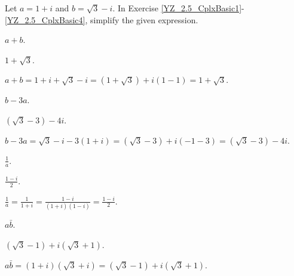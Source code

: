 \documentclass{ximera}
\begin{document}
Let $a=1+i$ and $b=\sqrt{3}-i$. In Exercise \ref{YZ_2.5_CplxBasic1}-\ref{YZ_2.5_CplxBasic4}, simplify the given expression.
\begin{exercise} \label{YZ_2.5_CplxBasic1}
$a+b$.

\begin{solution}
\ans $1+\sqrt{3}$.

\soln $a+b=1+i+\sqrt{3}-i=(1+\sqrt{3})+i(1-1)=1+\sqrt{3}$.

\end{solution}
\end{exercise}

\begin{exercise}\label{YZ_2.5_CplxBasic2}
$b-3a$.

\begin{solution}
\ans $(\sqrt{3}-3)-4i$.

\soln $b-3a=\sqrt{3}-i-3(1+i)=(\sqrt{3}-3)+i(-1-3)=(\sqrt{3}-3) - 4i$.
\end{solution}
\end{exercise}

\begin{exercise}\label{YZ_2.5_CplxBasic3}
$\frac{1}{a}$.

\begin{solution}
\ans $\frac{1-i}{2}$.

\soln $\frac1a=\frac{1}{1+i}=\frac{1-i}{(1+i)(1-i)}=\frac{1-i}{2}$.
\end{solution}
\end{exercise}


\begin{exercise}\label{YZ_2.5_CplxBasic4}
$a\bar{b}$.

\begin{solution}
\ans $(\sqrt{3}-1)+i(\sqrt{3}+1)$.

\soln $a\bar{b}=(1+i)(\sqrt{3}+i)=(\sqrt{3}-1) + i(\sqrt{3}+1)$.
\end{solution}
\end{exercise}
\end{document}
